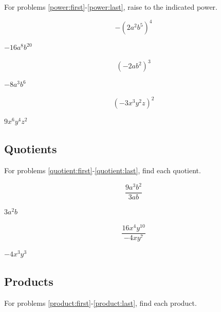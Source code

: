 \documentclass[fleqn,addpoints]{exam}
\begin{document}
\begin{questions}
For problems \ref{power:first}-\ref{power:last}, raise to the indicated power.

\question[3]
\label{power:first}
\[ -(2a^2b^5)^4 \]
\begin{solution}[3 cm]
\( -16a^8b^{20} \)
\end{solution}

\question[3]
\[ (-2ab^2)^3 \]
\begin{solution}[3 cm]
\( -8a^3b^6 \)
\end{solution}

\question[3]
\label{power:last}
\[ (-3x^3y^2z)^2 \]
\begin{solution}[3 cm]
\( 9x^6y^4z^2 \)
\end{solution}



\subsection{Quotients}

For problems \ref{quotient:first}-\ref{quotient:last}, find each quotient.

\question[3]
\label{quotient:first}
\[ \frac{9a^3b^2}{3ab} \]
\begin{solution}[3 cm]
\( 3a^2b \)
\end{solution}

\question[4]
\label{quotient:last}
\[ \frac{16x^4y^{10}}{-4xy^7} \]
\begin{solution}[3 cm]
$ -4x^3y^3 $
\end{solution}


\subsection{Products}

For problems \ref{product:first}-\ref{product:last}, find each product.



\end{questions}
\end{document}
